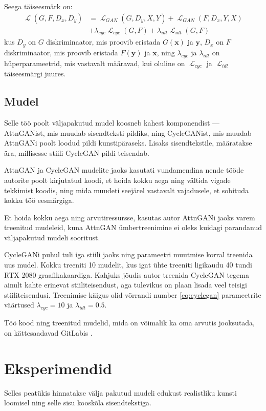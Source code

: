 \documentclass{vilgym}
\DeclareMathOperator{\loss}{\mathcal{L}}
\begin{document}
	Seega täiseesmärk on:
	\begin{equation} \label{eq:cyclegan}
		\begin{aligned}
			\loss(G, F, D_x, D_y) &= \loss_{GAN}(G, D_y, X, Y) + \loss_{GAN}(F, D_x, Y, X) \\
								  &+ \lambda_{cyc} \loss_{cyc}(G, F) + \lambda_{idt} \loss_{idt}(G, F)
		\end{aligned}
	\end{equation}
	kus $ D_y $ on $ G $ diskriminaator, mis proovib eristada $ G(\boldsymbol{x}) $ ja $ \boldsymbol{y} $, $ D_x $ on  $ F $ diskriminaator, mis proovib eristada $ F(\boldsymbol{y}) $ ja $ \boldsymbol{x} $, ning $ \lambda_{cyc} $ ja $ \lambda_{idt} $ on hüperparameetrid, mis vastavalt määravad, kui oluline on $ \loss_{cyc} $ ja $ \loss_{idt} $ täiseesmärgi juures. \parencite{cyclegan}

	\subsection{Mudel}
	Selle töö poolt väljapakutud mudel koosneb kahest komponendist --- AttnGANist, mis muudab sisendteksti pildiks, ning CycleGANist, mis muudab AttnGANi poolt loodud pildi kunstipäraseks. Lisaks sisendtekstile, määratakse ära, millisesse stiili CycleGAN pildi teisendab.

	AttnGAN ja CycleGAN mudelite jaoks kasutati vundamendina nende tööde autorite poolt kirjutatud koodi, et hoida kokku aega ning vältida vigade tekkimist koodis, ning mida muudeti seejärel vastavalt vajadusele, et sobituda kokku töö eesmärgiga.

	Et hoida kokku aega ning arvutiressursse, kasutas autor AttnGANi jaoks varem treenitud mudeleid, kuna AttnGAN ümbertreenimine ei oleks kuidagi parandanud väljapakutud mudeli sooritust.

	CycleGANi puhul tuli iga stiili jaoks ning parameetri muutmise korral treenida uus mudel. Kokku treeniti 10  mudelit, kus igat ühte treeniti ligikaudu 40 tundi RTX 2080 graafikakaardiga. Kahjuks jõudis autor treenida CycleGAN tegema ainult kahte erinevat stiiliteisendust, aga tulevikus on plaan lisada veel teisigi stiiliteisendusi. Treenimise käigus olid võrrandi number \ref{eq:cyclegan} parameetrite väärtused $ \lambda_{cyc} = 10 $ ja $ \lambda_{idt} = 0.5 $.

	Töö kood ning treenitud mudelid, mida on võimalik ka oma arvutis jooksutada, on kättesaadavad GitLabis \parencite{text2art-gan}.

	\section{Eksperimendid}
	Selles peatükis hinnatakse välja pakutud mudeli edukust realistliku kunsti loomisel ning selle sisu kooskõla sisendtekstiga.
\end{document}
